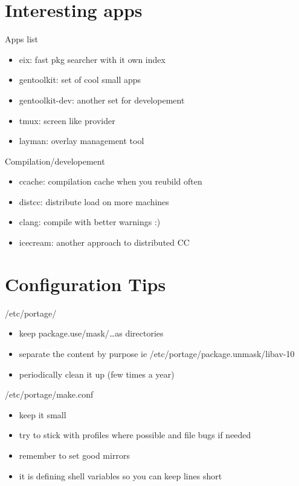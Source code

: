 \documentclass{beamer}
\begin{document}
\section{Interesting apps}

\begin{frame}{Apps list}
	\begin{itemize}
		\item eix: fast pkg searcher with it own index
		\item gentoolkit: set of cool small apps
		\item gentoolkit-dev: another set for developement
		\item tmux: screen like provider
		\item layman: overlay management tool
	\end{itemize}
\end{frame}

\begin{frame}{Compilation/developement}
	\begin{itemize}
		\item ccache: compilation cache when you reubild often
		\item distcc: distribute load on more machines
		\item clang: compile with better warnings :)
		\item icecream: another approach to distributed CC
	\end{itemize}
\end{frame}

\section{Configuration Tips}

\begin{frame}{/etc/portage/}
	\begin{itemize}
	\item keep package.use/mask/\ldots as directories
	\item separate the content by purpose ie /etc/portage/package.unmask/libav-10
	\item periodically clean it up (few times a year)
	\end{itemize}
\end{frame}

\begin{frame}{/etc/portage/make.conf}
	\begin{itemize}
	\item keep it small
	\item try to stick with profiles where possible and file bugs if needed
	\item remember to set good mirrors
	\item it is defining shell variables so you can keep lines short
	\end{itemize}
\end{frame}
\end{document}
